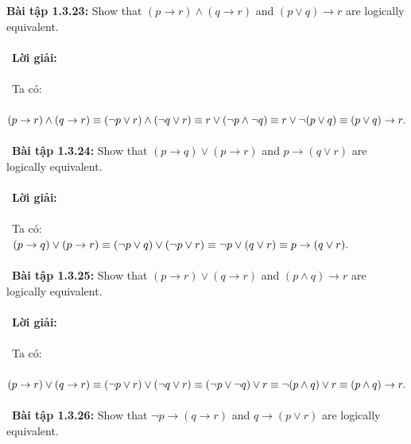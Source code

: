 \documentclass[a4paper]{article}
\begin{document}
\textbf{Bài tập 1.3.23: }Show that $(p \rightarrow r) \land (q \rightarrow r)$ and $(p \lor q) \rightarrow r$ are logically equivalent. \\\ \\\
\textbf{Lời giải:} \\\ \\\
Ta có: \\\
$(p \rightarrow r) \land (q \rightarrow r) \\\equiv (\lnot p \lor r) \land (\lnot q \lor r) \\\equiv r \lor (\lnot p \land \lnot q) \\\equiv r \lor \lnot (p \lor q)\\\equiv (p \lor q) \rightarrow r.$ \\\ \\\
\textbf{Bài tập 1.3.24: }Show that $(p \rightarrow q) \lor (p \rightarrow r)$ and $p \rightarrow (q \lor r)$ are logically equivalent. \\\ \\\
\textbf{Lời giải:} \\\ \\\
Ta có: \\\
$(p \rightarrow q) \lor (p \rightarrow r) \\\equiv (\lnot p \lor q) \lor (\lnot p \lor r) \\\equiv \lnot p \lor (q \lor r) \\\equiv p \rightarrow (q \lor r).$ \\\ \\\
\textbf{Bài tập 1.3.25: }Show that $(p \rightarrow r) \lor (q \rightarrow r)$ and $(p \land q) \rightarrow r$ are logically equivalent. \\\ \\\
\textbf{Lời giải: } \\\ \\\
Ta có: \\\
$(p \rightarrow r) \lor (q \rightarrow r) \\\equiv (\lnot p \lor r) \lor (\lnot q \lor r) \\\equiv (\lnot p \lor \lnot q) \lor r \\\equiv \lnot (p \land q) \lor r \\\equiv (p \land q) \rightarrow r.$ \\\ \\\
\textbf{Bài tập 1.3.26: }Show that $\lnot p \rightarrow (q \rightarrow r)$ and $q \rightarrow (p \lor r)$ are logically equivalent. \\\ \\\
\end{document}
